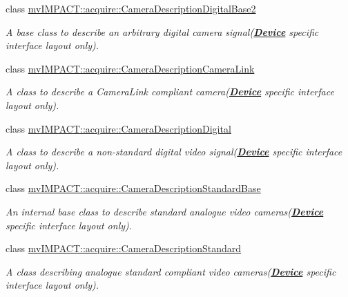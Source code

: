 \begin{DoxyCompactItemize}
class \hyperlink{classmv_i_m_p_a_c_t_1_1acquire_1_1_camera_description_digital_base2}{mv\+I\+M\+P\+A\+C\+T\+::acquire\+::\+Camera\+Description\+Digital\+Base2}
\begin{DoxyCompactList}\small\item\em A base class to describe an arbitrary digital camera signal({\bfseries \hyperlink{classmv_i_m_p_a_c_t_1_1acquire_1_1_device}{Device}} specific interface layout only). \end{DoxyCompactList}\item 
class \hyperlink{classmv_i_m_p_a_c_t_1_1acquire_1_1_camera_description_camera_link}{mv\+I\+M\+P\+A\+C\+T\+::acquire\+::\+Camera\+Description\+Camera\+Link}
\begin{DoxyCompactList}\small\item\em A class to describe a Camera\+Link\textregistered{} compliant camera({\bfseries \hyperlink{classmv_i_m_p_a_c_t_1_1acquire_1_1_device}{Device}} specific interface layout only). \end{DoxyCompactList}\item 
class \hyperlink{classmv_i_m_p_a_c_t_1_1acquire_1_1_camera_description_digital}{mv\+I\+M\+P\+A\+C\+T\+::acquire\+::\+Camera\+Description\+Digital}
\begin{DoxyCompactList}\small\item\em A class to describe a non-\/standard digital video signal({\bfseries \hyperlink{classmv_i_m_p_a_c_t_1_1acquire_1_1_device}{Device}} specific interface layout only). \end{DoxyCompactList}\item 
class \hyperlink{classmv_i_m_p_a_c_t_1_1acquire_1_1_camera_description_standard_base}{mv\+I\+M\+P\+A\+C\+T\+::acquire\+::\+Camera\+Description\+Standard\+Base}
\begin{DoxyCompactList}\small\item\em An internal base class to describe standard analogue video cameras({\bfseries \hyperlink{classmv_i_m_p_a_c_t_1_1acquire_1_1_device}{Device}} specific interface layout only). \end{DoxyCompactList}\item 
class \hyperlink{classmv_i_m_p_a_c_t_1_1acquire_1_1_camera_description_standard}{mv\+I\+M\+P\+A\+C\+T\+::acquire\+::\+Camera\+Description\+Standard}
\begin{DoxyCompactList}\small\item\em A class describing analogue standard compliant video cameras({\bfseries \hyperlink{classmv_i_m_p_a_c_t_1_1acquire_1_1_device}{Device}} specific interface layout only). \end{DoxyCompactList}\item 

\end{DoxyCompactItemize}
